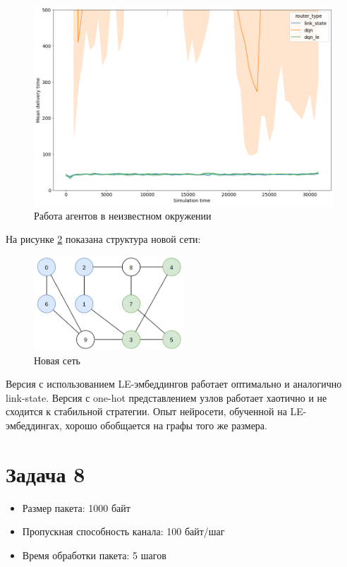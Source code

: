 \documentclass[a4paper]{article}
\begin{document}
\begin{figure}[H]
    \centering
    \includegraphics[width=\textwidth]{figs/unknown-net}
    \caption{Работа агентов в неизвестном окружении}\label{fig:unk}
\end{figure}

На рисунке \ref{fig:new} показана структура новой сети:

\begin{figure}[H]
    \centering
    \includegraphics[width=0.5\textwidth]{figs/new}
    \caption{Новая сеть}\label{fig:new}
\end{figure}

Версия с использованием LE-эмбеддингов работает оптимально и аналогично
link-state. Версия с one-hot представлением узлов работает хаотично и не
сходится к стабильной стратегии. Опыт нейросети, обученной на LE-эмбеддингах,
хорошо обобщается на графы того же размера.

\section{Задача 8}

\begin{itemize}
    \item Размер пакета: 1000 байт

    \item Пропускная способность канала: 100 байт/шаг

    \item Время обработки пакета: 5 шагов
\end{itemize}
\end{document}
